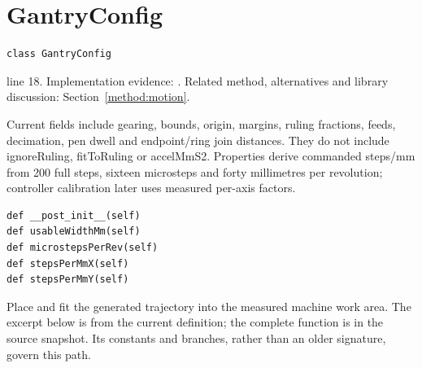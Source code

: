 \section{GantryConfig}\label{fn:reproduce:GantryConfig}
\begin{lstlisting}[style=sig]
class GantryConfig
\end{lstlisting}
 line 18. Implementation evidence: \cite{code2026}. Related method, alternatives and library discussion: Section~\ref{method:motion}.


Current fields include gearing, bounds, origin, margins, ruling fractions, feeds, decimation, pen dwell and endpoint/ring join distances. They do not include ignoreRuling, fitToRuling or accelMmS2. Properties derive commanded steps/mm from 200 full steps, sixteen microsteps and forty millimetres per revolution; controller calibration later uses measured per-axis factors.


\begin{lstlisting}[style=plain]
def __post_init__(self)
def usableWidthMm(self)
def microstepsPerRev(self)
def stepsPerMmX(self)
def stepsPerMmY(self)
\end{lstlisting}
Place and fit the generated trajectory into the measured machine work area. The excerpt below is from the current definition; the complete function is in the source snapshot. Its constants and branches, rather than an older signature, govern this path.



